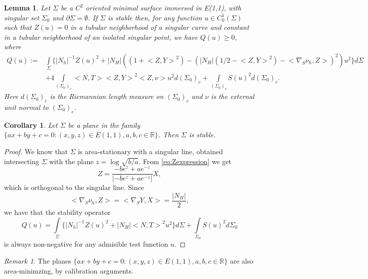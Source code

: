 \documentclass[10pt]{amsart}
\newtheorem{lemma}[theorem]{Lemma}
\newtheorem{corollary}[theorem]{Corollary}
\theoremstyle{definition}
\theoremstyle{remark}
\newtheorem{remark}[theorem]{Remark}
\numberwithin{equation}{section}
\begin{document}
\begin{lemma}\label{Stability operator II} Let ${\Sigma}$ be a $C^2$ oriented minimal surface immersed in {E(1,1)}, with singular set ${\Sigma}_0$ and $\partial{\Sigma}=\emptyset$. If ${\Sigma}$ is stable then, for any function $u\in C^1_0({\Sigma})$ such that $Z(u)=0$ in a tubular neighborhood of a singular curve and constant in a tubular neighborhood of an isolated singular point, we have $Q(u){\geqslant} 0$, where
\begin{equation*}
\begin{split}
Q(u):=&\int\limits_{\Sigma}\{|N_h|^{-1}Z(u)^2+{|N_{H}|}( (1+{\big<{Z,Y}\big>}^2)-({|N_{H}|} (1/2-{\big<{Z,Y}\big>}^2)-{\big<{{\nabla}_S \nu_h,Z}\big>}   )^2  )u^2\}d{\Sigma}\\
&+4\int\limits_{({\Sigma}_0)_c}{{\big<{N,T}\big>}}{\big<{Z,Y}\big>}^2{\big<{Z,\nu}\big>}u^2d({\Sigma}_0)_c+\int\limits_{({\Sigma}_0)_c} S(u)^2  d({\Sigma}_0)_c.
\end{split}
\end{equation*}
Here $d({\Sigma}_0)_c$ is the Riemannian length measure on $({\Sigma}_0)_c$ and $\nu$ is the external unit normal to $({\Sigma}_0)_c$.
\end{lemma}

\begin{corollary}
Let ${\Sigma}$ be a plane in the family $\{ a x+b y+ c=0: (x,y,z)\in{E(1,1)}, a,b,c\in {{\mathbb{R}}}\}$. Then ${\Sigma}$ is stable.
\end{corollary}

\begin{proof} We know that ${\Sigma}$ is area-stationary with a singular line, obtained intersecting ${\Sigma}$ with the plane $z=\log\sqrt{b/a}$.  From \eqref{eq:Zexpression} we get
\[
Z=\frac{-b e^z+ a e^{-z}}{|-b e^z+ a e^{-z}|}X, 
\]
which is orthogonal to the singular line. Since 
\[
{\big<{{\nabla}_S \nu_h,Z}\big>}={\big<{{\nabla}_S Y,X}\big>}=\frac{|N_{H}|}{2},
\]
we have that the stability operator
\[
Q(u)=\int\limits_{\Sigma}\{|N_h|^{-1}Z(u)^2+{|N_{H}|}{{\big<{N,T}\big>}}^2 u^2\}d{\Sigma}+\int\limits_{{\Sigma}_0} S(u)^2  d{\Sigma}_0
\]
is always non-negative for any admisible test function $u$.
\end{proof}

\begin{remark} The planes $\{ a x+b y+ c=0: (x,y,z)\in{E(1,1)}, a,b,c\in {{\mathbb{R}}}\}$ are also area-minimzing, by calibration arguments. 

\end{remark}
\end{document}
